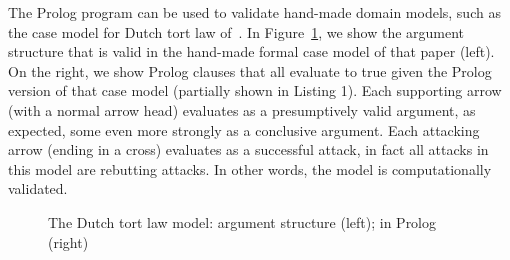 \documentclass{IOS-Book-Article}
\begin{document}
The Prolog program can be used to validate hand-made domain models, such as the case model for Dutch tort law of~\cite{Verheij2017Formalizing}. In Figure~\ref{fig:tort}, we show the argument structure that is valid in the hand-made formal case model of that paper (left). On the right, we show Prolog clauses that all evaluate to true given the Prolog version of that case model (partially shown in Listing 1). Each supporting arrow (with a normal arrow head) evaluates as a presumptively valid argument, as expected, some even more strongly as a conclusive argument. Each attacking arrow (ending in a cross) evaluates as a successful attack, in fact all attacks in this model are rebutting attacks. In other words, the model is computationally validated.

\begin{figure}[btp]
	\scalebox{0.8}{}
\caption{The Dutch tort law model: argument structure (left); in Prolog (right)}
\label{fig:tort}
\end{figure}
\end{document}
